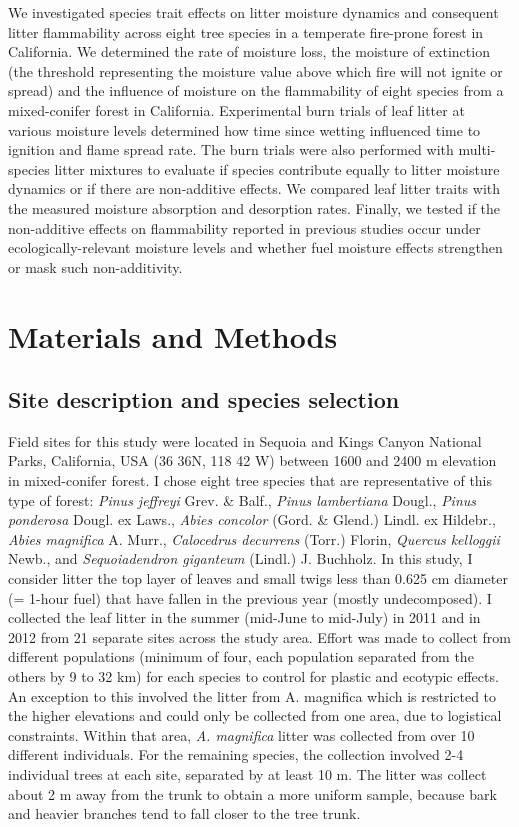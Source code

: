 \documentclass[fire,article,submit,moreauthors,pdftex]{Definitions/mdpi}
\begin{document}
We investigated species trait effects on litter moisture dynamics and consequent litter flammability across eight tree species in a temperate fire-prone forest in California. We determined the rate of moisture loss, the moisture of extinction (the threshold representing the moisture value above which fire will not ignite or spread) and the influence of moisture on the flammability of eight species from a mixed-conifer forest in California. Experimental burn trials of leaf litter at various moisture levels determined how time since wetting influenced time to ignition and flame spread rate. The burn trials were also performed with multi-species litter mixtures to evaluate if species contribute equally to litter moisture dynamics or if there are non-additive effects. We compared leaf litter traits with the measured moisture absorption and desorption rates. Finally, we tested if the non-additive effects on flammability reported in previous studies occur under ecologically-relevant moisture levels and whether fuel moisture effects strengthen or mask such non-additivity.


\section{Materials and Methods}

\subsection{Site description and species selection}

Field sites for this study were located in Sequoia and Kings Canyon National Parks, California, USA (36 36N, 118 42 W) between 1600 and 2400 m elevation in mixed-conifer forest. I chose eight tree species that are representative of this type of forest: \emph{Pinus jeffreyi} Grev. \& Balf., \emph{Pinus lambertiana} Dougl., \emph{Pinus ponderosa} Dougl. ex Laws., \emph{Abies concolor} (Gord. \& Glend.) Lindl. ex Hildebr., \emph{Abies magnifica} A. Murr., \emph{Calocedrus decurrens} (Torr.) Florin, \emph{Quercus kelloggii} Newb., and \emph{Sequoiadendron giganteum} (Lindl.) J. Buchholz. In this study, I consider litter the top layer of leaves and small twigs less than 0.625 cm diameter (= 1-hour fuel) that have fallen in the previous year (mostly undecomposed). I collected the leaf litter in the summer (mid-June to mid-July) in 2011 and in 2012 from 21 separate sites across the study area. Effort was made to collect from different populations (minimum of four, each population separated from the others by 9 to 32 km) for each species to control for plastic and ecotypic effects. An exception to this involved the litter from A. magnifica which is restricted to the higher elevations and could only be collected from one area, due to logistical constraints. Within that area, \emph{A. magnifica} litter was collected from over 10 different individuals. For the remaining species, the collection involved 2-4 individual trees at each site, separated by at least 10 m. The litter was collect about 2 m away from the trunk to obtain a more uniform sample, because bark and heavier branches tend to fall closer to the tree trunk.
\end{document}
